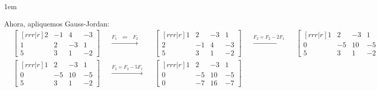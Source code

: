 \documentclass[12pt, fleqn]{report}                             %
\newenvironment{SmallIndentation}[1][0.75em]                    %
        {\begin{adjustwidth}{#1}{}\begin{footnotesize}}             %
        {\end{footnotesize}\end{adjustwidth}}                       %
\DeclareMathOperator \Space {\quad}                             %
\DeclareMathOperator \MiniSpace {\;}                            %
\theoremstyle{break}                                            %
\newcommand \lEqual  {\MiniSpace \Leftrightarrow \MiniSpace}    %
\newcommand \lLongTo {\longrightarrow}                          %
\begin{document}
\begin{SmallIndentation}[1em]
                    Ahora, apliquemos Gauss-Jordan:
                    \begin{align*}
                        &
                        \begin{bmatrix}[r r r | r]
                            2 & -1 &  4 & -3       \\
                            1 &  2 & -3 &  1       \\
                            5 &  3 &  1 & -2  
                        \end{bmatrix}
                        &&
                        \overset{F_1 \lEqual F_2}{\lLongTo}
                        &&
                        \begin{bmatrix}[r r r | r]
                            1 &  2 & -3 &  1       \\
                            2 & -1 &  4 & -3       \\
                            5 &  3 &  1 & -2  
                        \end{bmatrix}
                        &&
                        \overset{F_2 = F_2 -2F_1}{\lLongTo}
                        &&
                        \begin{bmatrix}[r r r | r]
                            1 &  2 & -3 &  1       \\
                            0 & -5 & 10 & -5       \\
                            5 &  3 &  1 & -2  
                        \end{bmatrix}
                        \\
                        &
                        \begin{bmatrix}[r r r | r]
                            1 &  2 & -3 &  1       \\
                            0 & -5 & 10 & -5       \\
                            5 &  3 &  1 & -2  
                        \end{bmatrix}
                        &&
                        \overset{F_3 = F_3 -5F_1}{\lLongTo}
                        &&
                        \begin{bmatrix}[r r r | r]
                            1 &  2 & -3  &  1       \\
                            0 & -5 & 10  & -5       \\
                            0 & -7 & 16  & -7  
                        \end{bmatrix}

\end{align*}
\end{SmallIndentation}
\end{document}
